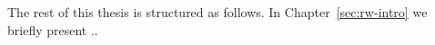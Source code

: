 The rest of this thesis is structured as follows. In Chapter~\ref{sec:rw-intro} we briefly present ..

\begin{comment}
 The remainder of this thesis is structured as follows. In
Chapter~\ref{ch:technical_background}, we provide technical background on
MapReduce and BigTable. In Chapter~\ref{ch:related_work}, we present a
summary of previous work in the areas of duplicate and near-duplicate detection,
information retrieval on web archives, and MapReduce applications in graph
processing. Following that, we state our problem and describe solutions in
Chapter~\ref{ch:redundancy_control}. In Chapter~\ref{ch:mapreduce_impl}, we
describe an implementation of our solution using the MapReduce framework. In
Chapter~\ref{ch:experiments}, we present our experimental results. We conclude
this thesis and outline directions of future research in Chapter~\ref{ch:future_work}.
\end{comment}
